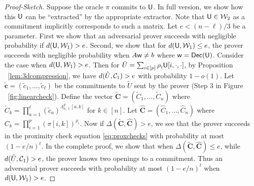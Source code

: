 \begin{proof}[Proof-Sketch]
Suppose the oracle $\pi$ commits to $\mathsf{U}$. In full version, we show how
 this $\mathsf{U}$ can be ``extracted'' by the appropriate extractor. Note that $\mathsf{U}\in
\mathcal{W}_2$ as a commitment implicitly corresponds to such a matrix. Let $e<(n-\ell)/3$ be a parameter. First we show that 
an adversarial prover succeeds with negligible probability if $d(\mathsf{U},\mathcal{W}_1)>e$. Second, we
show that for $d(\mathsf{U},\mathcal{W}_1)\leq e$, the prover succeeds with negligible probability when
$A\mathsf{w}\neq b$ where $\mathsf{w}=\mathsf{Dec}(\mathsf{U})$. Consider the case when $d(\mathsf{U},\mathcal{W}_1)>e$. Then for
$\tilde{U}=\sum_{i\in [p]}\rho_i\mathsf{U}[i,\cdot,\cdot]$, by Proposition ~\ref{lem:3dcompression},
 we have $d(\tilde{U},\mathcal{C}_1)>e$ with probability $1-o(1)$. Let $\tilde{\bm{c}}=(\tilde{c}_1,
\ldots,\tilde{c}_\ell)$ be the commitments to $\tilde{U}$ sent by the prover
(Step 3 in Figure ~\ref{fig:linearcheck}). Define 
the vector $\tilde{\bm{C}}=(\tilde{C}_1,\ldots,\tilde{C}_n)$ where
$\tilde{C}_k=\prod_{a=1}^\ell (\tilde{c}_a)^{\Lambda_{n,\ell}^T[a,k]}$ for $k\in [n]$.
 Let $\hat{\bm{C}}=(\hat{C}_1,\ldots,\hat{C}_n)$ where
$\hat{C}_k=\prod_{i=1}^p(\pi[i,k])^{\rho_i}$. Now if
$\Delta(\tilde{\bm{C}},\hat{\bm{C}})>e$, we see that the prover succeeds in the
proximity check equation \eqref{eq:proxchecks} with probability at most $(1-e/n)^t$. 
In the complete
proof, we show that when $\Delta(\tilde{\bm{C}},\hat{\bm{C}})\leq e$, 
while $d(\tilde{U},\mathcal{C}_1)>e$, the prover knows two openings to a commitment.
Thus an adversarial prover succeeds with probability at most $(1-e/n)^t$ when
$d(\mathsf{U},\mathcal{W}_1)>e$.


\end{proof}
